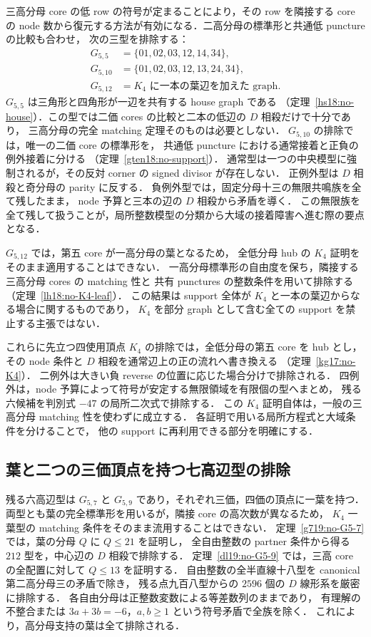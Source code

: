 三高分母 core の低 row の符号が定まることにより，その row を隣接する core の
node 数から復元する方法が有効になる．二高分母の標準形と共通低 puncture の比較も合わせ，
次の三型を排除する：
\[
 \begin{split}
 G_{5,5}&=\{01,02,03,12,14,34\},\\
 G_{5,10}&=\{01,02,03,12,13,24,34\},\\
 G_{5,12}&=K_4\text{ に一本の葉辺を加えた graph}.
 \end{split}
\]
$G_{5,5}$ は三角形と四角形が一辺を共有する house graph である
（定理~\ref{hs18:no-house}）．この型では二価 cores の比較と二本の低辺の $D$ 相殺だけで十分であり，
三高分母の完全 matching 定理そのものは必要としない．
$G_{5,10}$ の排除では，唯一の二価 core の標準形を，
共通低 puncture における通常接着と正負の例外接着に分ける
（定理~\ref{gten18:no-support}）．
通常型は一つの中央模型に強制されるが，その反対 corner の signed divisor が存在しない．
正例外型は $D$ 相殺と奇分母の parity に反する．
負例外型では，固定分母十三の無限共鳴族を全て残したまま，
node 予算と三本の辺の $D$ 相殺から矛盾を導く．
この無限族を全て残して扱うことが，局所整数模型の分類から大域の接着障害へ進む際の要点となる．

$G_{5,12}$ では，第五 core が一高分母の葉となるため，
全低分母 hub の $K_4$ 証明をそのまま適用することはできない．
一高分母標準形の自由度を保ち，隣接する三高分母 cores の matching 性と
共有 punctures の整数条件を用いて排除する
（定理~\ref{lh18:no-K4-leaf}）．
この結果は support 全体が $K_4$ と一本の葉辺からなる場合に関するものであり，
$K_4$ を部分 graph として含む全ての support を禁止する主張ではない．

これらに先立つ四使用頂点 $K_4$ の排除では，全低分母の第五 core を hub とし，
その node 条件と $D$ 相殺を通常辺上の正の流れへ書き換える
（定理~\ref{kg17:no-K4}）．
二例外は大きい負 reverse の位置に応じた場合分けで排除される．
四例外は，node 予算によって符号が安定する無限領域を有限個の型へまとめ，
残る六候補を判別式 $-47$ の局所二次式で排除する．
この $K_4$ 証明自体は，一般の三高分母 matching 性を使わずに成立する．
各証明で用いる局所方程式と大域条件を分けることで，
他の support に再利用できる部分を明確にする．

\subsection{葉と二つの三価頂点を持つ七高辺型の排除}

残る六高辺型は $G_{5,7}$ と $G_{5,9}$ であり，それぞれ三価，四価の頂点に一葉を持つ．
両型とも葉の完全標準形を用いるが，隣接 core の高次数が異なるため，
$K_4$ 一葉型の matching 条件をそのまま流用することはできない．
定理~\ref{g719:no-G5-7} では，葉の分母 $Q$ に $Q\le21$ を証明し，
全自由整数の partner 条件から得る $212$ 型を，中心辺の $D$ 相殺で排除する．
定理~\ref{dl19:no-G5-9} では，三高 core の全配置に対して $Q\le13$ を証明する．
自由整数の全半直線十八型を canonical 第二高分母三の矛盾で除き，
残る点九百八型からの $2596$ 個の $D$ 線形系を厳密に排除する．
各自由分母は正整数変数による等差数列のままであり，
有理解の不整合または $3a+3b=-6$，$a,b\ge1$ という符号矛盾で全族を除く．
これにより，高分母支持の葉は全て排除される．

